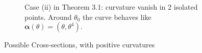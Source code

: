 \begin{center}
\begin{figure}
\begin{subfigure}{.45\textwidth}
    \caption{Case (ii) in Theorem 3.1: curvature vanish in 2 isolated points. Around $\theta_0$ the curve behaves like $\bm\alpha(\theta)=(\theta, \theta^4).$}
    \end{subfigure}
    \caption{Possible Cross-sections,  with positive curvatures}
    \end{figure}
    \end{center}